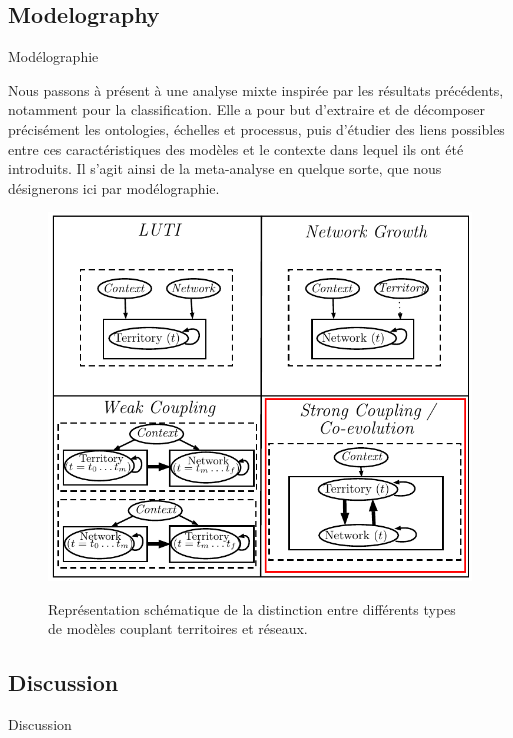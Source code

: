 \subsection{Modelography}{Modélographie}


Nous passons à présent à une analyse mixte inspirée par les résultats précédents, notamment pour la classification. Elle a pour but d'extraire et de décomposer précisément les ontologies, échelles et processus, puis d'étudier des liens possibles entre ces caractéristiques des modèles et le contexte dans lequel ils ont été introduits. Il s'agit ainsi de la meta-analyse en quelque sorte, que nous désignerons ici par modélographie.



\begin{figure}
\centering
\includegraphics[width=\textwidth]{Figures/Modelography/coevolution}
\caption{}{Représentation schématique de la distinction entre différents types de modèles couplant territoires et réseaux.}
\end{figure}














\subsection{Discussion}{Discussion}













